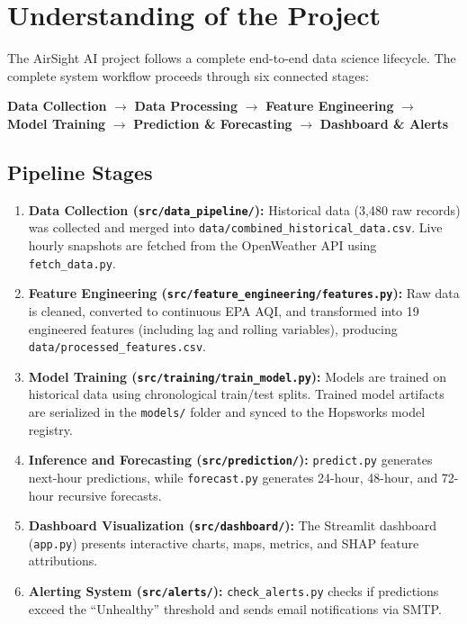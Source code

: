 \documentclass[12pt,a4paper]{article}
\begin{document}
\section{Understanding of the Project}

The AirSight AI project follows a complete end-to-end data science lifecycle. The complete system workflow proceeds through six connected stages:

\begin{center}
\textbf{Data Collection} $\rightarrow$ \textbf{Data Processing} $\rightarrow$ \textbf{Feature Engineering} $\rightarrow$ \textbf{Model Training} $\rightarrow$ \textbf{Prediction \& Forecasting} $\rightarrow$ \textbf{Dashboard \& Alerts}
\end{center}

\subsection{Pipeline Stages}
\begin{enumerate}
    \item \textbf{Data Collection (\texttt{src/data\_pipeline/}):} Historical data (3,480 raw records) was collected and merged into \texttt{data/combined\_historical\_data.csv}. Live hourly snapshots are fetched from the OpenWeather API using \texttt{fetch\_data.py}.
    \item \textbf{Feature Engineering (\texttt{src/feature\_engineering/features.py}):} Raw data is cleaned, converted to continuous EPA AQI, and transformed into 19 engineered features (including lag and rolling variables), producing \texttt{data/processed\_features.csv}.
    \item \textbf{Model Training (\texttt{src/training/train\_model.py}):} Models are trained on historical data using chronological train/test splits. Trained model artifacts are serialized in the \texttt{models/} folder and synced to the Hopsworks model registry.
    \item \textbf{Inference and Forecasting (\texttt{src/prediction/}):} \texttt{predict.py} generates next-hour predictions, while \texttt{forecast.py} generates 24-hour, 48-hour, and 72-hour recursive forecasts.
    \item \textbf{Dashboard Visualization (\texttt{src/dashboard/}):} The Streamlit dashboard (\texttt{app.py}) presents interactive charts, maps, metrics, and SHAP feature attributions.
    \item \textbf{Alerting System (\texttt{src/alerts/}):} \texttt{check\_alerts.py} checks if predictions exceed the ``Unhealthy'' threshold and sends email notifications via SMTP.
\end{enumerate}
\end{document}
